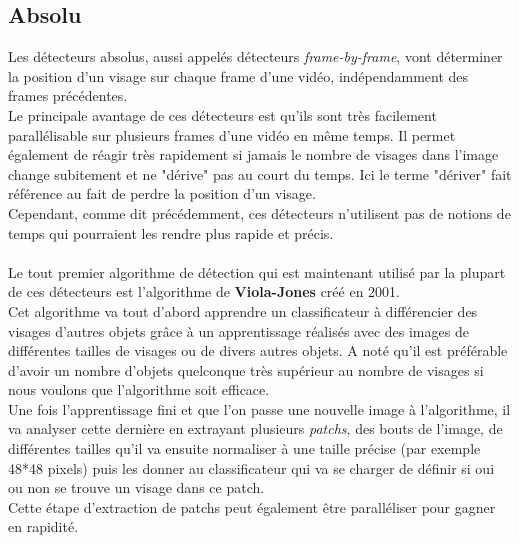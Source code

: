 \documentclass[overfullbox, poster]{polytech/polytech}
\begin{document}
\subsection{Absolu}
\label{absolu}
Les détecteurs absolus, aussi appelés détecteurs \textit{frame-by-frame}, vont déterminer la position d'un visage sur chaque frame d'une vidéo, indépendamment des frames précédentes.\\
Le principale avantage de ces détecteurs est qu'ils sont très facilement parallélisable sur plusieurs frames d'une vidéo en même temps. Il permet également de réagir très rapidement si jamais le nombre de visages dans l'image change subitement et ne "dérive" pas au court du temps. Ici le terme "dériver" fait référence au fait de perdre la position d'un visage.\\
Cependant, comme dit précédemment, ces détecteurs n'utilisent pas de notions de temps qui pourraient les rendre plus rapide et précis.\\
\\
Le tout premier algorithme de détection qui est maintenant utilisé par la plupart de ces détecteurs est l'algorithme de \textbf{Viola-Jones} \cite{violajones} créé en 2001.\\
Cet algorithme va tout d'abord apprendre un classificateur à différencier des visages d'autres objets grâce à un apprentissage réalisés avec des images de différentes tailles de visages ou de divers autres objets. A noté qu'il est préférable d'avoir un nombre d'objets quelconque très supérieur au nombre de visages si nous voulons que l'algorithme soit efficace.\\
Une fois l'apprentissage fini et que l'on passe une nouvelle image à l'algorithme, il va analyser cette dernière en extrayant plusieurs \textit{patchs}, des bouts de l'image, de différentes tailles qu'il va ensuite normaliser à une taille précise (par exemple 48*48 pixels) puis les donner au classificateur qui va se charger de définir si oui ou non se trouve un visage dans ce patch.\\
Cette étape d'extraction de patchs peut également être paralléliser pour gagner en rapidité.\\
\end{document}

